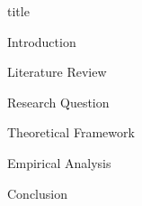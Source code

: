 \documentclass{article}
\begin{document}
{title}

\frontmatter

\tableofcontents

\newpage
\listoffigures


\mainmatter

{Introduction}

{Literature Review}

{Research Question}

{Theoretical Framework}

{Empirical Analysis}

{Conclusion}


\newpage
\printbibliography[heading = bibintoc, title = Bibliography]


\end{document}

